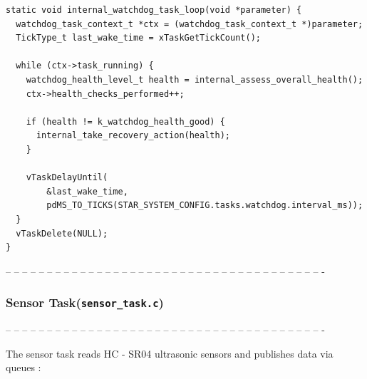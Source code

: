 \begin{lstlisting}
static void internal_watchdog_task_loop(void *parameter) {
  watchdog_task_context_t *ctx = (watchdog_task_context_t *)parameter;
  TickType_t last_wake_time = xTaskGetTickCount();

  while (ctx->task_running) {
    watchdog_health_level_t health = internal_assess_overall_health();
    ctx->health_checks_performed++;

    if (health != k_watchdog_health_good) {
      internal_take_recovery_action(health);
    }

    vTaskDelayUntil(
        &last_wake_time,
        pdMS_TO_TICKS(STAR_SYSTEM_CONFIG.tasks.watchdog.interval_ms));
  }
  vTaskDelete(NULL);
}
\end{lstlisting}

        -- -- -- -- -- -- -- -- -- -- -- -- -- -- -- -- -- -- -- -- -- -- -- -- -- -- -- -- -- -- -- -- -- -- -- -- -- -- -
\subsubsection{Sensor Task(\texttt{sensor\_task.c})} %
        -- -- -- -- -- -- -- -- -- -- -- -- -- -- -- -- -- -- -- -- -- -- -- -- -- -- -- -- -- -- -- -- -- -- -- -- -- -- -

                                                                                                                          The sensor
                                                                                                                              task reads
                                                                                                                                  HC -
    SR04 ultrasonic sensors and publishes data via queues :

